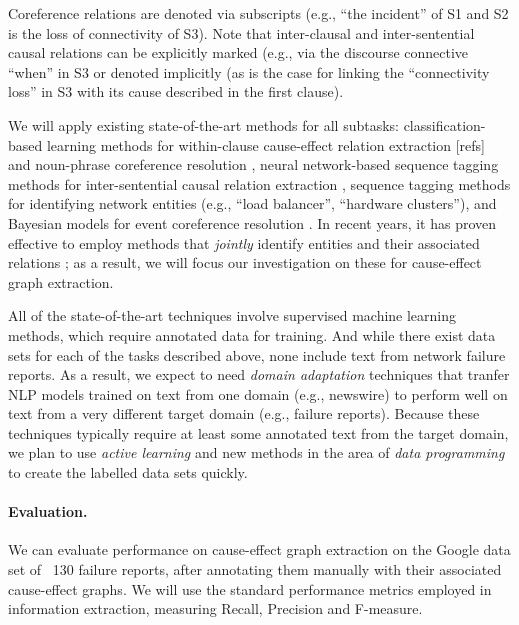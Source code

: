 \noindent
Coreference relations are denoted via subscripts (e.g., ``the
incident'' of S1 and S2 is the loss of connectivity of S3).
Note that inter-clausal and inter-sentential causal relations can
be explicitly marked (e.g., via the discourse connective ``when'' in
S3 or denoted implicitly (as is the case for linking the
``connectivity loss'' in S3 with its cause described in the first
clause).
    
We will apply existing state-of-the-art methods for all subtasks:
classification-based learning methods for within-clause cause-effect
relation extraction [refs] and noun-phrase coreference resolution
\cite{[refs]}, neural network-based sequence tagging methods for
inter-sentential causal relation extraction \cite{[refs]}, sequence tagging
methods \cite{[refs]} for identifying network entities (e.g., ``load
balancer'', ``hardware clusters''), and Bayesian models for event
coreference resolution \cite{[refs]}.  In recent years, it has proven
effective to employ methods that {\it jointly} identify entities and
their associated relations \cite{[refs]}; as a result, we will focus our
investigation on these for cause-effect graph extraction.

All of the state-of-the-art techniques involve supervised machine
learning methods, which require annotated data for training.  And
while there exist data sets for each of the tasks described above,
none include text from network failure reports.  As a result, we
expect to need {\it domain adaptation} techniques that tranfer NLP
models trained on text from one domain (e.g., newswire) to perform
well on text from a very different target domain (e.g., failure
reports).  Because these techniques typically require at least some
annotated text from the target domain, we plan to use {\it active
  learning} \cite{[refs]} and new methods in the area of {\it data
  programming} \cite{[refs]} to create the labelled data sets quickly.

\paragraph{Evaluation.} We can evaluate performance on cause-effect
graph extraction on the Google data set of ~130 failure reports, after
annotating them manually with their associated cause-effect graphs. We
will use the standard performance metrics employed in information
extraction, measuring Recall, Precision and F-measure.
\fi

